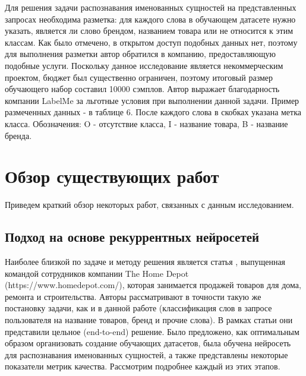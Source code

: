 \documentclass[12pt,a4paper]{article}
\begin{document}
\noindent Для решения задачи распознавания именованных сущностей на представленных запросах необходима разметка: для каждого слова в обучающем датасете нужно указать, является ли слово брендом, названием товара или не относится к этим классам. Как было отмечено, в открытом доступ подобных данных нет, поэтому для выполнения разметки автор обратился в компанию, предоставляющую подобные услуги. Поскольку данное исследование является некоммерческим проектом, бюджет был существенно ограничен, поэтому итоговый размер обучающего набор составил 10000 сэмплов. Автор выражает благодарность компании LabelMe за льготные условия при выполнении данной задачи. Пример размеченных данных - в таблице 6. После каждого слова в скобках указана метка класса. Обозначения: O - отсутствие класса, I - название товара, B - название бренда.

\begin{table}[H]
\begin{center}
    \caption{Примеры размеченных запросов}
\end{center}
\end{table}

\section{Обзор существующих работ}
Приведем краткий обзор некоторых работ, связанных с данным исследованием.
\subsection{Подход на основе рекуррентных нейросетей}
Наиболее близкой по задаче и методу решения является статья \cite{ner}, выпущенная командой сотрудников компании The Home Depot (https://www.homedepot.com/), которая занимается продажей товаров для дома, ремонта и строительства. Авторы рассматривают в точности такую же постановку задачи, как и в данной работе (классификация слов в запросе пользователя на название товаров, бренд и прочие слова). В рамках статьи они представили цельное (end-to-end) решение. Было предложено, как оптимальным образом организовать создание обучающих датасетов, была обучена нейросеть для распознавания именованных сущностей, а также представлены некоторые показатели метрик качества. Рассмотрим подробнее каждый из этих этапов. 
\end{document}
